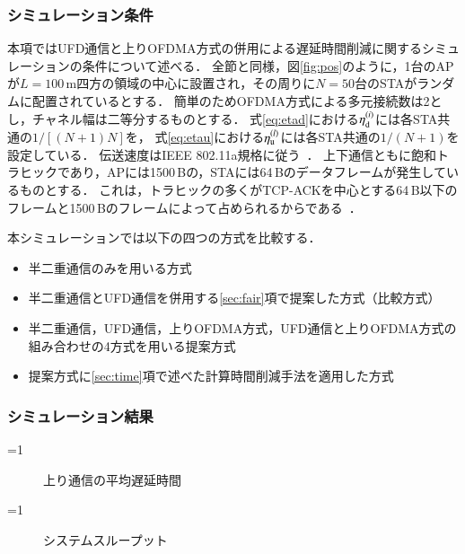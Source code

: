 \documentclass[master]{kuisthesis}		%
\newcounter{flagFig}
\begin{document}
		\subsubsection{シミュレーション条件}
			本項ではUFD通信と上りOFDMA方式の併用による遅延時間削減に関するシミュレーションの条件について述べる．
			全節と同様，図\ref{fig:pos}のように，1台のAPが$L=100$\,m四方の領域の中心に設置され，その周りに$N=50$台のSTAがランダムに配置されているとする．
			簡単のためOFDMA方式による多元接続数は2とし，チャネル幅は二等分するものとする．
			式\eqref{eq:etad}における$\eta_{\rm d}^{(i)}$には各STA共通の$1/[(N+1)N]$を，
			式\eqref{eq:etau}における$\eta_{\rm u}^{(l)}$には各STA共通の$1/(N+1)$を設定している．
			伝送速度はIEEE 802.11a規格に従う~\cite{std}．
			上下通信ともに飽和トラヒックであり，APには1500\,Bの，STAには64\,Bのデータフレームが発生しているものとする．
			これは，トラヒックの多くがTCP-ACKを中心とする64\,B以下のフレームと1500\,Bのフレームによって占められるからである~\cite{traffic}．
			\par
			本シミュレーションでは以下の四つの方式を比較する．
			\begin{itemize}
				\item 半二重通信のみを用いる方式
				\item 半二重通信とUFD通信を併用する\ref{sec:fair}項で提案した方式（比較方式）
				\item 半二重通信，UFD通信，上りOFDMA方式，UFD通信と上りOFDMA方式の組み合わせの4方式を用いる提案方式
				\item 提案方式に\ref{sec:time}項で述べた計算時間削減手法を適用した方式
			\end{itemize}

		\subsubsection{シミュレーション結果}
			\ifnum\value{flagFig}=1 {\begin{figure}[htbp]
				\centering
				\caption{上り通信の平均遅延時間}
				\label{fig:delay}
				\end{figure}}\fi
			\ifnum\value{flagFig}=1 {\begin{figure}[htbp]
				\centering
				\caption{システムスループット}
				\label{fig:thr}
			\end{figure}}\fi
\end{document}
